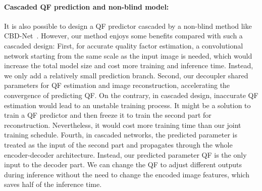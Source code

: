 \documentclass[10pt,twocolumn,letterpaper]{article}
\begin{document}
\paragraph{Cascaded QF prediction and non-blind model:} It is also possible to design a QF predictor cascaded by a non-blind method like CBD-Net~\cite{guo2019toward}. However, our method enjoys some benefits compared with such a cascaded design: First, for accurate quality factor estimation, a convolutional network starting from the same scale as the input image is needed, which would increase the total model size and cost more training and inference time. Instead, we only add a relatively small prediction branch. Second, our decoupler shared parameters for QF estimation and image reconstruction, accelerating the convergence of predicting QF. On the contrary, in cascaded design, inaccurate QF estimation would lead to an unstable training process. It might be a solution to train a QF predictor and then freeze it to train the second part for reconstruction. Nevertheless, it would cost more training time than our joint training schedule. Fourth, in cascaded networks, the predicted parameter is treated as the input of the second part and propagates through the whole encoder-decoder architecture. Instead, our predicted parameter QF is the only input to the decoder part. We can change the QF to adjust different outputs during inference without the need to change the encoded image features, which saves half of the inference time.
\end{document}
